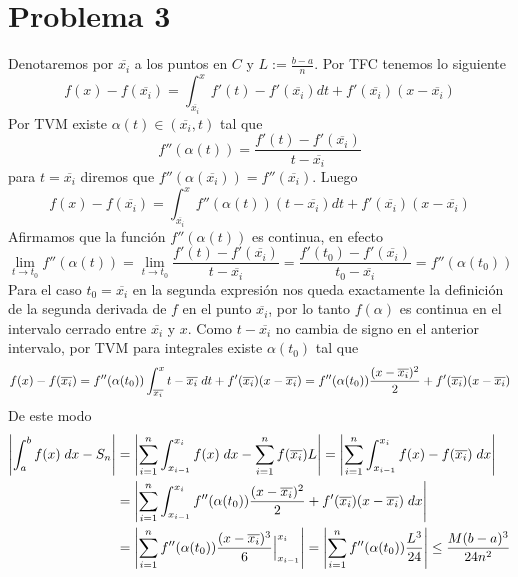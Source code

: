 \documentclass{article}
\begin{document}
\section*{Problema 3}
\noindent Denotaremos por $\overline{x_{i}}$ a los puntos en $C$ y $L:=\frac{b-a}{n}$. Por TFC 
tenemos lo siguiente
\begin{equation*}
    f(x)-f(\overline{x_{i}})=\int_{\overline{x_{i}}}^{x}f'(t)-f'(\overline{x_{i}})dt+
    f'(\overline{x_{i}})(x-\overline{x_{i}})
\end{equation*}
Por TVM existe $\alpha(t)\in(\overline{x_{i}},t)$ tal que
\begin{equation*}
    f''(\alpha(t))=\frac{f'(t)-f'(\overline{x_{i}})}{t-\overline{x_{i}}}
\end{equation*}
para $t=\overline{x_{i}}$ diremos que $f''(\alpha(\overline{x_{i}}))=f''(\overline{x_{i}})$. Luego
\begin{equation*}
    f(x)-f(\overline{x_{i}})=\int_{\overline{x_{i}}}^{x}f''(\alpha(t))(t-\overline{x_{i}})dt+
    f'(\overline{x_{i}})(x-\overline{x_{i}})
\end{equation*}
Afirmamos que la función $f''(\alpha(t))$ es continua, en efecto
\begin{equation*}
    \lim_{t\to t_{0}}f''(\alpha(t))=\lim_{t\to t_{0}}\frac{f'(t)-f'(\overline{x_{i}})}
    {t-\overline{x_{i}}}=\frac{f'(t_{0})-f'(\overline{x_{i}})}
    {t_{0}-\overline{x_{i}}}=f''(\alpha(t_{0}))
\end{equation*}
Para el caso $t_{0}=\overline{x_{i}}$ en la segunda expresión nos queda exactamente la definición 
de la segunda derivada de $f$ en el punto $\overline{x_{i}}$, por lo tanto $f(\alpha)$ es 
continua en el intervalo cerrado entre $\overline{x_{i}}$ y $x$. Como $t-\overline{x_{i}}$ no 
cambia de signo en el anterior intervalo, por TVM para integrales existe
$\alpha(t_{0})$ tal que
\begin{equation*}
    f(x)-f(\overline{x_{i}})=f''(\alpha(t_{0}))\int_{\overline{x_{i}}}^{x}t-\overline{x_{i}}
    \hspace{1mm}dt+f'(\overline{x_{i}})(x-\overline{x_{i}})=f''(\alpha(t_{0}))
    \frac{(x-\overline{x_{i}})^{2}}{2}+f'(\overline{x_{i}})(x-\overline{x_{i}})
\end{equation*}
De este modo
\begin{align*}
    \left|\int_{a}^{b}f(x)\hspace{1mm}dx-S_{n} \right| &= \left|\sum_{i=1}^{n}\int_{x_{i-1}}^{x_{i}}f(x)
    \hspace{1mm}dx-\sum_{i=1}^{n}f(\overline{x_{i}})L \right|=\left|\sum_{i=1}^{n}\int_{x_{i-1}}^{x_{i}}
    f(x)-f(\overline{x_{i}})\hspace{1mm}dx \right| \\
    &= \left|\sum_{i=1}^{n}\int_{x_{i-1}}^{x_{i}}f''(\alpha(t_{0}))\frac{(x-\overline{x_{i}})^{2}}
    {2}+f'(\overline{x_{i}})(x-\overline{x_{i}})\hspace{1mm}dx \right| \\
    &= \left|\sum_{i=1}^{n}f''(\alpha(t_{0}))\frac{(x-\overline{x_{i}})^{3}}{6}
    \Big|_{x_{i-1}}^{x_{i}} \right|=\left|\sum_{i=1}^{n}f''(\alpha(t_{0}))\frac{L^{3}}{24} \right|\leq
    \frac{M(b-a)^{3}}{24n^{2}}
\end{align*}
\end{document}
